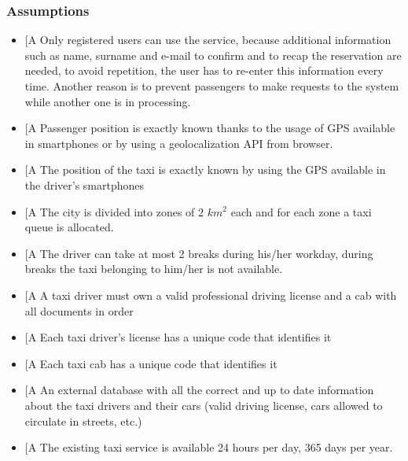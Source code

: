 \documentclass[a4paper,12pt]{article}%
\newcounter{assumptions_counter}
\begin{document}
\subsubsection{Assumptions}
\begin{itemize}
\item \label{a\arabic{assumptions_counter}}{[}A\arabic{assumptions_counter}{]}
Only registered users can use the service, because additional information such as name, surname and e-mail to confirm and to recap the reservation are needed, to avoid repetition, the user has to re-enter this information every time.
Another reason is to prevent passengers to make requests to the system while another one is in processing.
\item \label{a\arabic{assumptions_counter}}{[}A\arabic{assumptions_counter}{]} Passenger position is exactly known thanks to the usage of GPS available in smartphones or by using a geolocalization API from browser. 
\item \label{a\arabic{assumptions_counter}}{[}A\arabic{assumptions_counter}{]} The position of the taxi is exactly known by using the GPS available in the driver's smartphones
\item \label{a\arabic{assumptions_counter}}{[}A\arabic{assumptions_counter}{]} The city is divided into zones of 2 $km^2$ each and for each zone a taxi queue is allocated.
\item \label{a\arabic{assumptions_counter}}{[}A\arabic{assumptions_counter}{]} The driver can take at most 2 breaks during his/her workday, during breaks the taxi belonging to him/her is not available.
\item \label{a\arabic{assumptions_counter}}{[}A\arabic{assumptions_counter}{]} A taxi driver must own a valid professional driving license and a cab with all documents in order
\item \label{a\arabic{assumptions_counter}}{[}A\arabic{assumptions_counter}{]} Each taxi driver's license has a unique code that identifies it
\item \label{a\arabic{assumptions_counter}}{[}A\arabic{assumptions_counter}{]} Each taxi cab has a unique code that identifies it
\item \label{a\arabic{assumptions_counter}}{[}A\arabic{assumptions_counter}{]} An external database with all the correct and up to date information about the taxi drivers and their cars (valid driving license, cars allowed to circulate in streets, etc.)
\item \label{a\arabic{assumptions_counter}}{[}A\arabic{assumptions_counter}{]} The existing taxi service is available 24 hours per day, 365 days per year.
\end{itemize}
\end{document}

